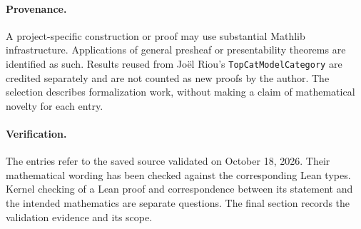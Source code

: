 \paragraph{Provenance.}
A project-specific construction or proof may use substantial Mathlib infrastructure.
Applications of general presheaf or presentability theorems are identified as such.
Results reused from Joël Riou's \texttt{TopCatModelCategory} are credited separately and are not counted as new proofs by the author.
The selection describes formalization work, without making a claim of mathematical novelty for each entry.

\paragraph{Verification.}
The entries refer to the saved source validated on October 18, 2026.
Their mathematical wording has been checked against the corresponding Lean types.
Kernel checking of a Lean proof and correspondence between its statement and the intended mathematics are separate questions.
The final section records the validation evidence and its scope.
